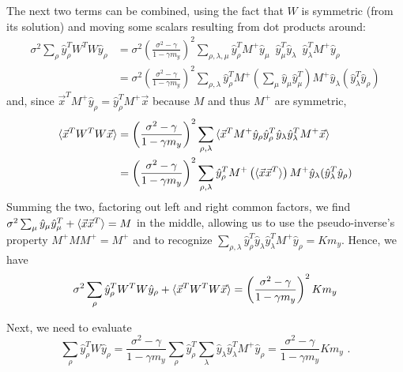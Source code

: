\documentclass[letter, 12pt]{article}
\begin{document}
The next two terms can be combined, using the fact that $W$ is symmetric (from its solution) and moving some scalars resulting from dot products around:
\begin{align*}
	\sigma^2 \sum_{\rho} \hat{y}_{\rho}^T W^T W \hat{y}_{\rho} 
	&= \sigma^2 \left(\frac{\sigma^2 - \gamma}{1 - \gamma m_y}\right)^2 \sum_{\rho, \lambda, \mu} \hat{y}_{\rho}^T M^+ \hat{y}_{\mu} \,\,\, \hat{y}_{\mu}^T \hat{y}_{\lambda}  \,\,\, \hat{y}_{\lambda}^T M^+ \hat{y}_{\rho}	\\
	&= \sigma^2 \left(\frac{\sigma^2 - \gamma}{1 - \gamma m_y}\right)^2 \sum_{\rho, \lambda} \hat{y}_{\rho}^T M^+ \left(\sum_{\mu} \hat{y}_{\mu} \hat{y}_{\mu}^T \right) M^+ \hat{y}_{\lambda} (\hat{y}_{\lambda}^T \hat{y}_{\rho})
\end{align*}
and, since $\vec{x}^T M^+ \hat{y}_{\rho} = \hat{y}_{\rho}^T M^+ \vec{x}$ because $M$ and thus $M^+$ are symmetric,
\begin{align*}
	\braket{\vec{x}^T W^T W \vec{x}} 
	&= \left(\frac{\sigma^2 - \gamma}{1 - \gamma m_y}\right)^2 \sum_{\rho, \lambda} \braket{\vec{x}^T M^+ \hat{y}_{\rho} \hat{y}_{\rho}^T \hat{y}_{\lambda} \hat{y}_{\lambda}^T M^+ \vec{x} }	\\
	&= \left(\frac{\sigma^2 - \gamma}{1 - \gamma m_y}\right)^2 \sum_{\rho, \lambda} \hat{y}_{\rho}^T M^+ \left( \braket{\vec{x} \vec{x}^T} \right) M^+ \hat{y}_{\lambda} (\hat{y}_{\lambda}^T \hat{y}_{\rho})
\end{align*}
Summing the two, factoring out left and right common factors, we find $\sigma^2 \sum_{\mu} \hat{y}_{\mu} \hat{y}_{\mu}^T + \braket{\vec{x}\vec{x}^T} = M$ in the middle, allowing us to use the pseudo-inverse's property $M^+ M M^+ = M^+$ and to recognize $\sum_{\rho, \lambda} \hat{y}_{\rho}^T \hat{y}_{\lambda} \hat{y}_{\lambda}^T M^+ \hat{y}_{\rho} = K m_y$. Hence, we have
\begin{equation*}
	\sigma^2 \sum_{\rho} \hat{y}_{\rho}^T W^T W \hat{y}_{\rho}  + \braket{\vec{x}^T W^T W \vec{x}}  =  \left(\frac{\sigma^2 - \gamma}{1 - \gamma m_y}\right)^2 K m_y
\end{equation*}

Next, we need to evaluate
\begin{equation*}
	\sum_{\rho} \hat{y}_{\rho}^T W \hat{y}_{\rho} = \frac{\sigma^2 - \gamma}{1 - \gamma m_y} \sum_{\rho} \hat{y}_{\rho}^T \sum_{\lambda} \hat{y}_{\lambda} \hat{y}_{\lambda}^T M^+ \hat{y}_{\rho} =  \frac{\sigma^2 - \gamma}{1 - \gamma m_y} K m_y \,\, .
\end{equation*}
\end{document}
